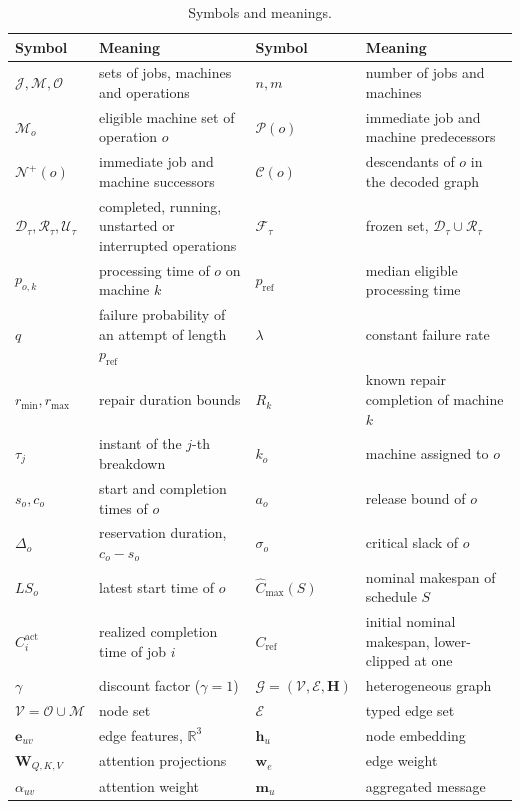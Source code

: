 \documentclass[conference]{IEEEtran}
\theoremstyle{remark}
\newcommand{\cP}{\mathcal{P}}
\newcommand{\cN}{\mathcal{N}}
\newcommand{\cE}{\mathcal{E}}
\newcommand{\cO}{\mathcal{O}}
\newcommand{\cU}{\mathcal{U}}
\newcommand{\cD}{\mathcal{D}}
\newcommand{\cR}{\mathcal{R}}
\newcommand{\cF}{\mathcal{F}}
\newcommand{\cJ}{\mathcal{J}}
\newcommand{\cM}{\mathcal{M}}
\newcommand{\cV}{\mathcal{V}}
\newcommand{\cC}{\mathcal{C}}
\newcommand{\cG}{\mathcal{G}}
\begin{document}
\begin{table}[!t]
\caption{Symbols and meanings.}
\label{tab:S-symbols}
\centering
\scriptsize
\setlength{\tabcolsep}{3pt}
\begin{tabular}{@{}p{1.75cm}p{6.05cm}p{1.75cm}p{6.05cm}@{}}
\toprule
\textbf{Symbol} & \textbf{Meaning} & \textbf{Symbol} & \textbf{Meaning}\\
\midrule
$\cJ,\cM,\cO$ & sets of jobs, machines and operations & $n,m$ & number of jobs and machines\\
$\cM_o$ & eligible machine set of operation $o$ & $\cP(o)$ & immediate job and machine predecessors\\
$\cN^{+}(o)$ & immediate job and machine successors & $\cC(o)$ & descendants of $o$ in the decoded graph\\
$\cD_\tau,\cR_\tau,\cU_\tau$ & completed, running, unstarted or interrupted operations & $\cF_\tau$ & frozen set, $\cD_\tau\cup\cR_\tau$\\
$p_{o,k}$ & processing time of $o$ on machine $k$ & $p_{\mathrm{ref}}$ & median eligible processing time\\
$q$ & failure probability of an attempt of length $p_{\mathrm{ref}}$ & $\lambda$ & constant failure rate\\
$r_{\min},r_{\max}$ & repair duration bounds & $R_k$ & known repair completion of machine $k$\\
$\tau_j$ & instant of the $j$-th breakdown & $k_o$ & machine assigned to $o$\\
$s_o,c_o$ & start and completion times of $o$ & $a_o$ & release bound of $o$\\
$\Delta_o$ & reservation duration, $c_o-s_o$ & $\sigma_o$ & critical slack of $o$\\
$LS_o$ & latest start time of $o$ & $\hat{C}_{\max}(S)$ & nominal makespan of schedule $S$\\
$C_i^{\mathrm{act}}$ & realized completion time of job $i$ & $C_{\mathrm{ref}}$ & initial nominal makespan, lower-clipped at one\\
$\gamma$ & discount factor ($\gamma=1$) & $\cG=(\cV,\cE,\bm{H})$ & heterogeneous graph\\
$\cV=\cO\cup\cM$ & node set & $\cE$ & typed edge set\\
$\bm{e}_{uv}$ & edge features, $\mathbb{R}^3$ & $\bm{h}_u$ & node embedding\\
$\bm{W}_{Q,K,V}$ & attention projections & $\bm{w}_e$ & edge weight\\
$\alpha_{uv}$ & attention weight & $\bm{m}_u$ & aggregated message\\

\end{tabular}
\end{table}
\end{document}
